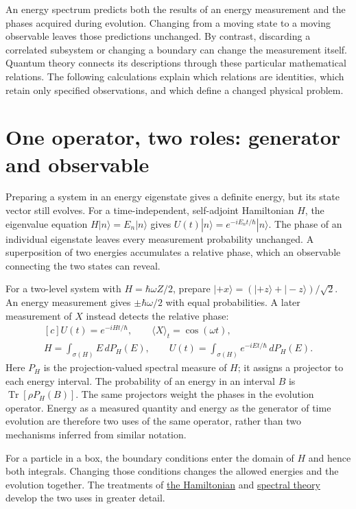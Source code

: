 \documentclass[11pt,oneside]{book}
\newenvironment{centeredalign}{\[\begin{gathered}[c]}{\end{gathered}\]}
\begin{document}
An energy spectrum predicts both the results of an energy measurement and
the phases acquired during evolution. Changing from a moving state to a
moving observable leaves those predictions unchanged. By contrast,
discarding a correlated subsystem or changing a boundary can change the
measurement itself. Quantum theory connects its descriptions through these
particular mathematical relations. The following calculations explain
which relations are identities, which retain only specified observations,
and which define a changed physical problem.


\section{One operator, two roles: generator and observable}


Preparing a system in an energy eigenstate gives a definite energy, but its
state vector still evolves. For a time-independent, self-adjoint Hamiltonian
\(H\), the eigenvalue equation \(H|n\rangle=E_n|n\rangle\) gives
\(U(t)|n\rangle=e^{-iE_nt/\hbar}|n\rangle\). The phase of an individual
eigenstate leaves every measurement probability unchanged. A superposition of
two energies accumulates a relative phase, which an observable connecting the
two states can reveal.

For a two-level system with \(H=\hbar\omega Z/2\), prepare
\(|+x\rangle=(|+z\rangle+|-z\rangle)/\sqrt2\). An energy measurement gives
\(\pm\hbar\omega/2\) with equal probabilities. A later measurement of \(X\)
instead detects the relative phase:
\begin{centeredalign}
U(t)=e^{-iHt/\hbar},\qquad
\langle X\rangle_t=\cos(\omega t),\\
H=\int_{\sigma(H)}E\,dP_H(E),\qquad
U(t)=\int_{\sigma(H)}e^{-iEt/\hbar}\,dP_H(E).
\end{centeredalign}
Here \(P_H\) is the projection-valued spectral measure of \(H\); it assigns
a projector to each energy interval. The probability of an energy in an
interval \(B\) is \(\operatorname{Tr}[\rho P_H(B)]\). The same projectors
weight the phases in the evolution operator. Energy as a measured quantity
and energy as the generator of time evolution are therefore two uses of the
same operator, rather than two mechanisms inferred from similar notation.

For a particle in a box, the boundary conditions enter the domain of \(H\)
and hence both integrals. Changing those conditions changes the allowed
energies and the evolution together. The treatments of
\hyperref[topic:hamiltonian-quantum-mechanics]{the Hamiltonian} and
\hyperref[topic:spectral-theory]{spectral theory} develop the two uses in
greater detail.
\end{document}
